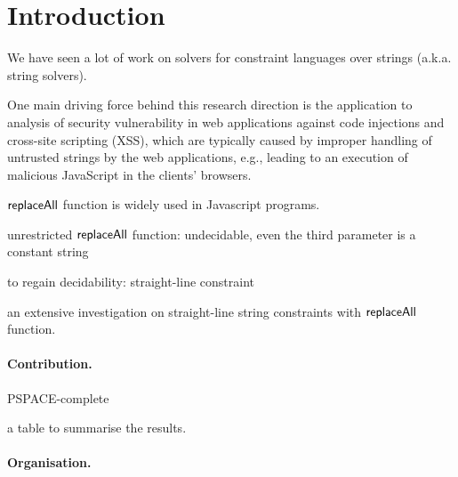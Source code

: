 
\section{Introduction}

We have seen  a lot of work on solvers for constraint languages over strings (a.k.a. string solvers). 

One main driving force behind this research direction is the application to analysis of security vulnerability in web applications against code injections and cross-site scripting (XSS), which are typically caused by improper handling of untrusted strings by the web applications, e.g., leading to an execution of malicious JavaScript in the clients' browsers. 

$\mathsf{replaceAll}$ function is widely used in Javascript programs.



\cite{LB16,TCJ16,YABI14}

unrestricted $\mathsf{replaceAll}$ function: undecidable, even the third parameter is a constant string

to regain decidability: straight-line constraint

an extensive investigation on straight-line string constraints with $\mathsf{replaceAll}$ function. 

\paragraph{Contribution.}

PSPACE-complete

a table to summarise the results.


\paragraph{Organisation.} 

